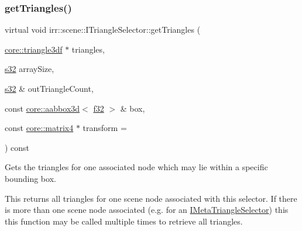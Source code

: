 \subsubsection{\texorpdfstring{get\+Triangles()}{getTriangles()}\hspace{0.1cm}{\footnotesize\ttfamily [3/6]}}
{\footnotesize\ttfamily virtual void irr\+::scene\+::\+I\+Triangle\+Selector\+::get\+Triangles (\begin{DoxyParamCaption}\item[{\hyperlink{namespaceirr_1_1core_a8983bda2678a7a67d97bf3c7be6c31c7}{core\+::triangle3df} $\ast$}]{triangles,  }\item[{\hyperlink{namespaceirr_ac66849b7a6ed16e30ebede579f9b47c6}{s32}}]{array\+Size,  }\item[{\hyperlink{namespaceirr_ac66849b7a6ed16e30ebede579f9b47c6}{s32} \&}]{out\+Triangle\+Count,  }\item[{const \hyperlink{classirr_1_1core_1_1aabbox3d}{core\+::aabbox3d}$<$ \hyperlink{namespaceirr_a0277be98d67dc26ff93b1a6a1d086b07}{f32} $>$ \&}]{box,  }\item[{const \hyperlink{namespaceirr_1_1core_a4c9d4e29899535971052810954a14431}{core\+::matrix4} $\ast$}]{transform = {} }\end{DoxyParamCaption}) const\hspace{0.3cm}{\ttfamily [pure virtual]}}



Gets the triangles for one associated node which may lie within a specific bounding box. 

This returns all triangles for one scene node associated with this selector. If there is more than one scene node associated (e.\+g. for an \hyperlink{classirr_1_1scene_1_1IMetaTriangleSelector}{I\+Meta\+Triangle\+Selector}) this this function may be called multiple times to retrieve all triangles.

